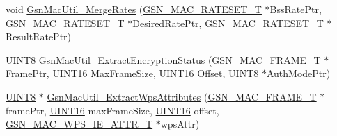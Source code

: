 \begin{DoxyCompactItemize}
\item 
void \hyperlink{a00524_a194f8b650af149b24556b2b35257f146}{GsnMacUtil\_\-MergeRates} (\hyperlink{a00125}{GSN\_\-MAC\_\-RATESET\_\-T} $\ast$BssRatePtr, \hyperlink{a00125}{GSN\_\-MAC\_\-RATESET\_\-T} $\ast$DesiredRatePtr, \hyperlink{a00125}{GSN\_\-MAC\_\-RATESET\_\-T} $\ast$ResultRatePtr)
\item 
\hyperlink{a00660_gab27e9918b538ce9d8ca692479b375b6a}{UINT8} \hyperlink{a00524_a65f38b0667390350fe7f75763194ebf8}{GsnMacUtil\_\-ExtractEncryptionStatus} (\hyperlink{a00116}{GSN\_\-MAC\_\-FRAME\_\-T} $\ast$FramePtr, \hyperlink{a00660_ga09f1a1fb2293e33483cc8d44aefb1eb1}{UINT16} MaxFrameSize, \hyperlink{a00660_ga09f1a1fb2293e33483cc8d44aefb1eb1}{UINT16} Offset, \hyperlink{a00660_gab27e9918b538ce9d8ca692479b375b6a}{UINT8} $\ast$AuthModePtr)
\item 
\hyperlink{a00660_gab27e9918b538ce9d8ca692479b375b6a}{UINT8} $\ast$ \hyperlink{a00524_aba2f962dfb1814a04298d211a05f411e}{GsnMacUtil\_\-ExtractWpsAttributes} (\hyperlink{a00116}{GSN\_\-MAC\_\-FRAME\_\-T} $\ast$framePtr, \hyperlink{a00660_ga09f1a1fb2293e33483cc8d44aefb1eb1}{UINT16} maxFrameSize, \hyperlink{a00660_ga09f1a1fb2293e33483cc8d44aefb1eb1}{UINT16} offset, \hyperlink{a00138}{GSN\_\-MAC\_\-WPS\_\-IE\_\-ATTR\_\-T} $\ast$wpsAttr)
\end{DoxyCompactItemize}


